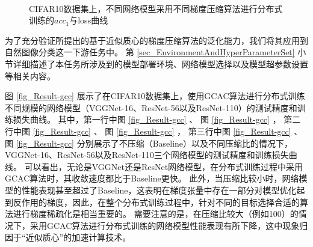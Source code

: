\documentclass{xdupgthesis}
\begin{document}
\begin{figure}[!t]
{        \label{fig_Result-resnet110-acc-contrast}
    }
     \\
    \caption{CIFAR10数据集上，不同网络模型采用不同梯度压缩算法进行分布式训练的$acc_{1}$与loss曲线}
    \label{fig_Result-gcc-contrast}
\end{figure}

为了充分验证所提出的基于近似质心的梯度压缩算法的泛化能力，我们将其应用到自然图像分类这一下游任务中。
第 \ref{sec_EnvironmentAndHyperParameterSet} 小节详细描述了本任务所涉及到的模型部署环境、网络模型选择以及模型超参数设置等相关内容。

图 \ref{fig_Result-gcc} 展示了在CIFAR10数据集上，使用GCAC算法进行分布式训练不同规模的网络模型（VGGNet-16、ResNet-56以及ResNet-110）的测试精度和训练损失曲线。
其中，第一行中图 \ref{fig_Result-gcc} 、
图 \ref{fig_Result-gcc} ，
第二行中图 \ref{fig_Result-gcc} 、
图 \ref{fig_Result-gcc} ，
第三行中图 \ref{fig_Result-gcc} 、
图 \ref{fig_Result-gcc}  
分别展示了不压缩（Baseline）以及不同压缩比的情况下，VGGNet-16、ResNet-56以及ResNet-110三个网络模型的测试精度和训练损失曲线。
可以看出，无论是VGGNet还是ResNet网络模型，在分布式训练过程中采用GCAC算法时，其收敛速度都比于Baseline更快。
此外，当压缩比较小时，网络模型的性能表现甚至超过了Baseline，这表明在梯度张量中存在一部分对模型优化起到反作用的梯度，因此，在整个分布式训练过程中，针对不同的目标选择合适的算法进行梯度稀疏化是相当重要的。
需要注意的是，在压缩比较大（例如100）的情况下，采用GCAC算法进行分布式训练的网络模型性能表现有所下降，这中现象归因于“近似质心”的加速计算技术。
\end{document}
